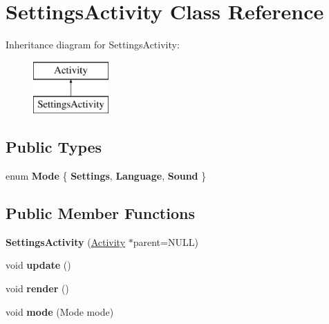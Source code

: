 \hypertarget{classSettingsActivity}{\section{Settings\-Activity Class Reference}
\label{classSettingsActivity}
}
Inheritance diagram for Settings\-Activity\-:\begin{figure}[H]
\begin{center}
\leavevmode
\includegraphics[height=2.000000cm]{classSettingsActivity}
\end{center}
\end{figure}
\subsection*{Public Types}
\begin{DoxyCompactItemize}
\item 
enum {\bfseries Mode} \{ {\bfseries Settings}, 
{\bfseries Language}, 
{\bfseries Sound}
 \}
\end{DoxyCompactItemize}
\subsection*{Public Member Functions}
\begin{DoxyCompactItemize}
\item 
\hypertarget{classSettingsActivity_a2243a5dd63dcda9d28112cfa698ee3a4}{{\bfseries Settings\-Activity} (\hyperlink{classActivity}{Activity} $\ast$parent=N\-U\-L\-L)}\label{classSettingsActivity_a2243a5dd63dcda9d28112cfa698ee3a4}

\item 
\hypertarget{classSettingsActivity_ad4a8a1f8cd88aa8a3e2735a839967d30}{void {\bfseries update} ()}\label{classSettingsActivity_ad4a8a1f8cd88aa8a3e2735a839967d30}

\item 
\hypertarget{classSettingsActivity_a8601d220ba07dfaa166148d46fb7afa5}{void {\bfseries render} ()}\label{classSettingsActivity_a8601d220ba07dfaa166148d46fb7afa5}

\item 
\hypertarget{classSettingsActivity_a11ca3925b64a926011dd4a87645fc8b6}{void {\bfseries mode} (Mode mode)}\label{classSettingsActivity_a11ca3925b64a926011dd4a87645fc8b6}

\end{DoxyCompactItemize}
